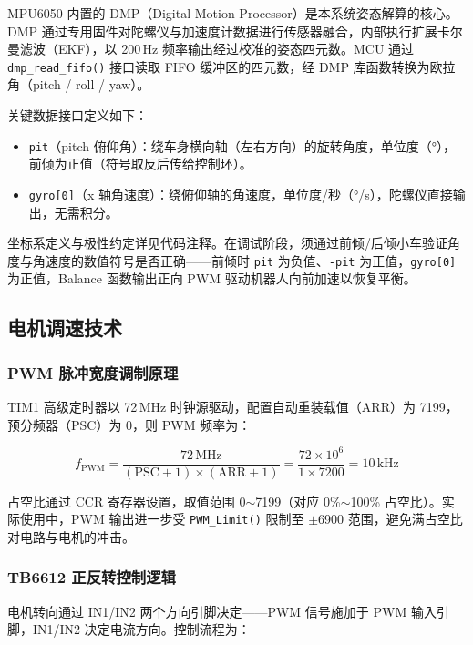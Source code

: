 \documentclass[12pt,a4paper,UTF8]{ctexrep}
\begin{document}
MPU6050 内置的 DMP（Digital Motion Processor）是本系统姿态解算的核心。DMP 通过专用固件对陀螺仪与加速度计数据进行传感器融合，内部执行扩展卡尔曼滤波（EKF），以 200\,Hz 频率输出经过校准的姿态四元数。MCU 通过 \texttt{dmp\_read\_fifo()} 接口读取 FIFO 缓冲区的四元数，经 DMP 库函数转换为欧拉角（pitch / roll / yaw）。

关键数据接口定义如下：

\begin{itemize}
  \item \texttt{pit}（pitch 俯仰角）：绕车身横向轴（左右方向）的旋转角度，单位度（°），前倾为正值（符号取反后传给控制环）。
  \item \texttt{gyro[0]}（x 轴角速度）：绕俯仰轴的角速度，单位度/秒（°/s），陀螺仪直接输出，无需积分。
\end{itemize}

坐标系定义与极性约定详见代码注释。在调试阶段，须通过前倾/后倾小车验证角度与角速度的数值符号是否正确——前倾时 \texttt{pit} 为负值、\texttt{-pit} 为正值，\texttt{gyro[0]} 为正值，Balance 函数输出正向 PWM 驱动机器人向前加速以恢复平衡。

\subsection{电机调速技术}

\subsubsection{PWM 脉冲宽度调制原理}

TIM1 高级定时器以 72\,MHz 时钟源驱动，配置自动重装载值（ARR）为 7199，预分频器（PSC）为 0，则 PWM 频率为：

\begin{equation}
  f_{\text{PWM}} = \frac{72\,\text{MHz}}{(\text{PSC}+1) \times (\text{ARR}+1)}
                 = \frac{72 \times 10^6}{1 \times 7200} = 10\,\text{kHz}
\end{equation}

占空比通过 CCR 寄存器设置，取值范围 0$\sim$7199（对应 0\%$\sim$100\% 占空比）。实际使用中，PWM 输出进一步受 \texttt{PWM\_Limit()} 限制至 $\pm$6900 范围，避免满占空比对电路与电机的冲击。

\subsubsection{TB6612 正反转控制逻辑}

电机转向通过 IN1/IN2 两个方向引脚决定——PWM 信号施加于 PWM 输入引脚，IN1/IN2 决定电流方向。控制流程为：
\end{document}

